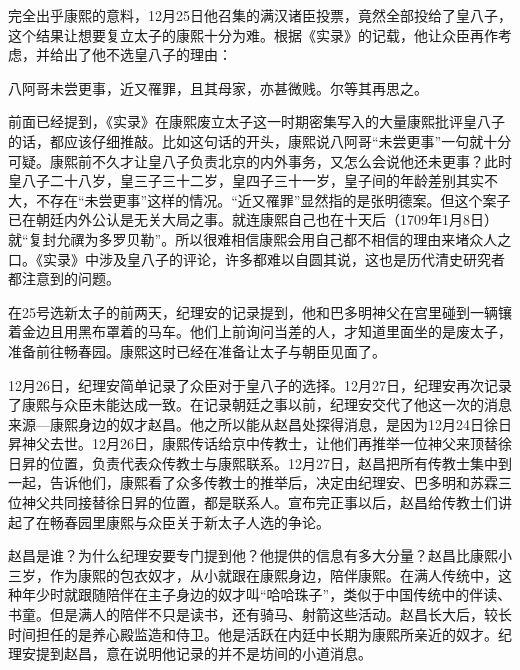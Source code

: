 
完全出乎康熙的意料，12月25日他召集的满汉诸臣投票，竟然全部投给了皇八子，这个结果让想要复立太子的康熙十分为难。根据《实录》的记载，他让众臣再作考虑，并给出了他不选皇八子的理由：



\begin{bookquote}八阿哥未尝更事，近又罹罪，且其母家，亦甚微贱。尔等其再思之。\end{bookquote}


前面已经提到，《实录》在康熙废立太子这一时期密集写入的大量康熙批评皇八子的话，都应该仔细推敲。比如这句话的开头，康熙说八阿哥“未尝更事”一句就十分可疑。康熙前不久才让皇八子负责北京的内外事务，又怎么会说他还未更事？此时皇八子二十八岁，皇三子三十二岁，皇四子三十一岁，皇子间的年龄差别其实不大，不存在“未尝更事”这样的情况。“近又罹罪”显然指的是张明德案。但这个案子已在朝廷内外公认是无关大局之事。就连康熙自己也在十天后（1709年1月8日）就“复封允禩为多罗贝勒”。所以很难相信康熙会用自己都不相信的理由来堵众人之口。《实录》中涉及皇八子的评论，许多都难以自圆其说，这也是历代清史研究者都注意到的问题。



在25号选新太子的前两天，纪理安的记录提到，他和巴多明神父在宫里碰到一辆镶着金边且用黑布罩着的马车。他们上前询问当差的人，才知道里面坐的是废太子，准备前往畅春园。康熙这时已经在准备让太子与朝臣见面了。



12月26日，纪理安简单记录了众臣对于皇八子的选择。12月27日，纪理安再次记录了康熙与众臣未能达成一致。在记录朝廷之事以前，纪理安交代了他这一次的消息来源—康熙身边的奴才赵昌。他之所以能从赵昌处探得消息，是因为12月24日徐日昇神父去世。12月26日，康熙传话给京中传教士，让他们再推举一位神父来顶替徐日昇的位置，负责代表众传教士与康熙联系。12月27日，赵昌把所有传教士集中到一起，告诉他们，康熙看了众多传教士的推举后，决定由纪理安、巴多明和苏霖三位神父共同接替徐日昇的位置，都是联系人。宣布完正事以后，赵昌给传教士们讲起了在畅春园里康熙与众臣关于新太子人选的争论。



赵昌是谁？为什么纪理安要专门提到他？他提供的信息有多大分量？赵昌比康熙小三岁，作为康熙的包衣奴才，从小就跟在康熙身边，陪伴康熙。在满人传统中，这种年少时就跟随陪伴在主子身边的奴才叫“哈哈珠子”，类似于中国传统中的伴读、书童。但是满人的陪伴不只是读书，还有骑马、射箭这些活动。赵昌长大后，较长时间担任的是养心殿监造和侍卫。他是活跃在内廷中长期为康熙所亲近的奴才。纪理安提到赵昌，意在说明他记录的并不是坊间的小道消息。


